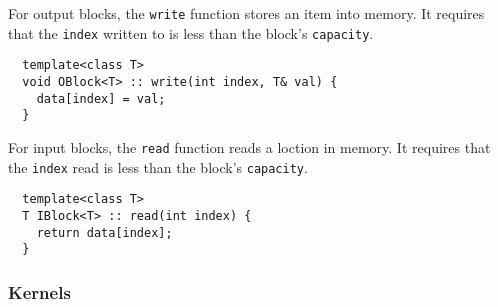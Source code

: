  For output blocks, the {\tt write} function stores an
item into memory.  It requires that the {\tt index} written to is less
than the block's {\tt capacity}.  
{\small
\begin{verbatim}
  template<class T>
  void OBlock<T> :: write(int index, T& val) {
    data[index] = val;
  }
\end{verbatim}}

 For input blocks, the {\tt read} function reads a loction
in memory.  It requires that the {\tt index} read is less than the
block's {\tt capacity}.
{\small
\begin{verbatim}
  template<class T>
  T IBlock<T> :: read(int index) {
    return data[index];
  }
\end{verbatim}}

\subsubsection{Kernels}
\label{sec:kernels}

